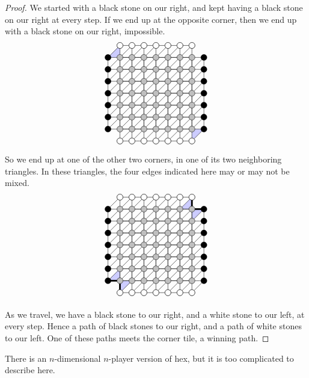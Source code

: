 \begin{proof}
We started with a black stone on our right, and kept having a black stone on our right at every step.
If we end up at the opposite corner, then we end up with a black stone on our right, impossible.
\[
\begin{tikzpicture}[scale=.5]
\fill[blue!20] (6,-1) -- (7,0) -- (6,0) -- cycle;
\fill[blue!20] (-1,6) -- (0,7) -- (0,6) -- cycle;
\draw (-1,0) grid (7,6);
\draw (0,-1) grid (6,7);
\foreach \i in {-1,...,6}
{
	\foreach \j in {0,...,5}
	{
		\draw (\i,\j) -- ({1+\i},{1+\j});
	}
}
\foreach \i in {0,...,6}
{
\draw ({\i-1},6) -- (\i,7);
\draw (\i,-1) -- ({\i+1},0);
}
\foreach \i in {0,...,6}
{
	\foreach \j in {-1,...,7}
	{
		\draw[black,fill=gray!50] (\i,\j) circle (.25cm);
	}
	\draw[black,fill=white] (\i,-1) circle (.25cm);
	\draw[black,fill=white] (\i,7) circle (.25cm);
	\draw[black,fill=black] (-1,\i) circle (.25cm);
	\draw[black,fill=black] (7,\i) circle (.25cm);
}
\end{tikzpicture}
\]
So we end up at one of the other two corners, in one of its two neighboring triangles.
In these triangles, the four edges indicated here may or may not be mixed.
\[
\begin{tikzpicture}[scale=.5]
\fill[blue!20] (0,-1) -- (1,0) -- (0,0) -- cycle;
\draw[line width=2pt] (0,-1) -- (0,0);
\fill[blue!20] (-1,0) -- (0,1) -- (0,0) -- cycle;
\draw[line width=2pt] (-1,0) -- (0,0);
\fill[blue!20] (6,6) -- (6,7) -- (5,6) -- cycle;
\draw[line width=2pt] (6,6) -- (6,7);
\fill[blue!20] (6,6) -- (7,6) -- (6,5) -- cycle;
\draw[line width=2pt] (6,6) -- (7,6);
\draw (-1,0) grid (7,6);
\draw (0,-1) grid (6,7);
\foreach \i in {-1,...,6}
{
	\foreach \j in {0,...,5}
	{
		\draw (\i,\j) -- ({1+\i},{1+\j});
	}
}
\foreach \i in {0,...,6}
{
\draw ({\i-1},6) -- (\i,7);
\draw (\i,-1) -- ({\i+1},0);
}
\foreach \i in {0,...,6}
{
	\foreach \j in {-1,...,7}
	{
		\draw[black,fill=gray!50] (\i,\j) circle (.25cm);
	}
	\draw[black,fill=white] (\i,-1) circle (.25cm);
	\draw[black,fill=white] (\i,7) circle (.25cm);
	\draw[black,fill=black] (-1,\i) circle (.25cm);
	\draw[black,fill=black] (7,\i) circle (.25cm);
}
\end{tikzpicture}
\]

As we travel, we have a black stone to our right, and a white stone to our left, at every step.
Hence a path of black stones to our right, and a path of white stones to our left.
One of these paths meets the corner tile, a winning path.
\end{proof}
There is an \(n\)-dimensional \(n\)-player version of hex, but it is too complicated to describe here.
